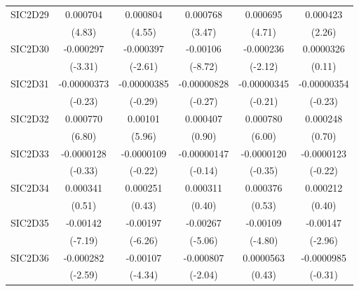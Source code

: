 \begin{table}[htbp]
\begin{tabular}{l*{5}{c}}
SIC2D29     &    0.000704\sym{***}&    0.000804\sym{***}&    0.000768\sym{***}&    0.000695\sym{***}&    0.000423\sym{*}  \\
            &      (4.83)         &      (4.55)         &      (3.47)         &      (4.71)         &      (2.26)         \\
SIC2D30     &   -0.000297\sym{***}&   -0.000397\sym{**} &    -0.00106\sym{***}&   -0.000236\sym{*}  &   0.0000326         \\
            &     (-3.31)         &     (-2.61)         &     (-8.72)         &     (-2.12)         &      (0.11)         \\
SIC2D31     & -0.00000373         & -0.00000385         & -0.00000828         & -0.00000345         & -0.00000354         \\
            &     (-0.23)         &     (-0.29)         &     (-0.27)         &     (-0.21)         &     (-0.23)         \\
SIC2D32     &    0.000770\sym{***}&     0.00101\sym{***}&    0.000407         &    0.000780\sym{***}&    0.000248         \\
            &      (6.80)         &      (5.96)         &      (0.90)         &      (6.00)         &      (0.70)         \\
SIC2D33     &  -0.0000128         &  -0.0000109         & -0.00000147         &  -0.0000120         &  -0.0000123         \\
            &     (-0.33)         &     (-0.22)         &     (-0.14)         &     (-0.35)         &     (-0.22)         \\
SIC2D34     &    0.000341         &    0.000251         &    0.000311         &    0.000376         &    0.000212         \\
            &      (0.51)         &      (0.43)         &      (0.40)         &      (0.53)         &      (0.40)         \\
SIC2D35     &    -0.00142\sym{***}&    -0.00197\sym{***}&    -0.00267\sym{***}&    -0.00109\sym{***}&    -0.00147\sym{**} \\
            &     (-7.19)         &     (-6.26)         &     (-5.06)         &     (-4.80)         &     (-2.96)         \\
SIC2D36     &   -0.000282\sym{**} &    -0.00107\sym{***}&   -0.000807\sym{*}  &   0.0000563         &  -0.0000985         \\
            &     (-2.59)         &     (-4.34)         &     (-2.04)         &      (0.43)         &     (-0.31)         \\

\end{tabular}
\end{table}
